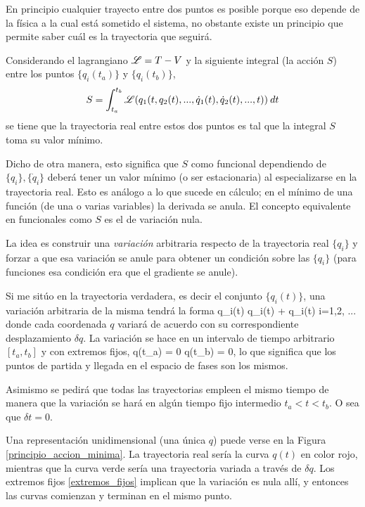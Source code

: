\documentclass[10pt,oneside]{CBFT_book}
\begin{document}
En principio cualquier trayecto entre dos puntos es posible porque eso depende de la física a la cual está sometido
el sistema, no obstante existe un principio que permite saber cuál es la trayectoria que seguirá.

Considerando el lagrangiano $ \mathscr{L} = T - V $ y la siguiente integral (la acción $S$) entre los puntos $ \{ q_i(t_a) \} $
y $ \{ q_i(t_b) \} $,
\[
	S = \int_{t_a}^{t_b} \mathscr{L}( q_1(t, q_2(t), ..., \dot{q}_1(t),\dot{q}_2(t), ...,t )) \: dt
\]
se tiene que la trayectoria real entre estos dos puntos es tal que la integral $S$ toma su valor mínimo.

Dicho de otra manera, esto significa que $ S $ como funcional dependiendo de $ \{ q_i \}, \{ \dot{q}_i \} $
deberá tener un valor mínimo (o ser estacionaria) al especializarse en la trayectoria real.
Esto es análogo a lo que sucede en cálculo; en el mínimo de una función (de una o varias variables) la derivada 
se anula. El concepto equivalente en funcionales como $ S $ es el de variación nula.

La idea es construir una {\it variación} arbitraria respecto de la trayectoria real $ \{ q_i \} $ y forzar a que esa 
variación se anule para obtener un condición sobre las $ \{ q_i \} $ (para funciones esa condición era que el gradiente
se anule).

Si me sitúo en la trayectoria verdadera, es decir el conjunto $ \{ q_i(t) \}$, una variación arbitraria de la misma
tendrá la forma
\be
	q_i(t) \rightarrow q_i(t) + \delta q_i(t) \qquad i=1,2, ...
	\label{variacion}
\ee
donde cada coordenada $ q $ variará de acuerdo con su correspondiente desplazamiento $\delta q $.
La variación se hace en un intervalo de tiempo arbitrario $ [t_a,t_b] $ y con extremos fijos, 
\be
	\delta q(t_a) = 0 \qquad \qquad \delta q(t_b) = 0,
	\label{extremos_fijos}
\ee
lo que significa que los puntos de partida y llegada en el espacio de fases son los mismos.

Asimismo se pedirá que todas las trayectorias empleen el mismo tiempo de manera que la variación se hará en algún
tiempo fijo intermedio $ t_a < t < t_b $. O sea que $\delta t = 0$.


Una representación unidimensional (una única $q$) puede verse en la Figura \ref{principio_accion_minima}.
La trayectoria real sería la curva $ q(t) $ en color rojo, mientras que la curva verde sería una trayectoria variada
a través de $ \delta q $. Los extremos fijos \eqref{extremos_fijos} implican que la variación es nula allí, y entonces
las curvas comienzan y terminan en el mismo punto.
\end{document}
